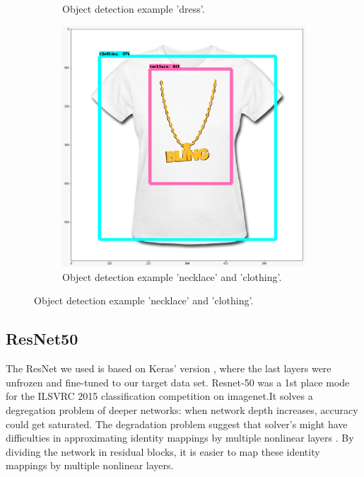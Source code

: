 \documentclass[10pt, a4paper]{article}
\begin{document}
\begin{multicols}{2}
\begin{figure}[H]
\begin{subfigure}[b]{0.3\columnwidth}
            \caption{Object detection example 'dress'.}
            \label{fig:object_dress}
          \end{subfigure}
          \hfill %
          \begin{subfigure}[b]{0.4\columnwidth}
            \includegraphics[width=\linewidth]{img/t_shirt_object_detection.jpeg}
            \caption{Object detection example 'necklace' and 'clothing'.}
            \label{fig:object_necklace_clothing}
          \end{subfigure}
        \end{figure}
		
		
		\subsection{ResNet50}
		The ResNet we used is based on Keras' version \cite{DBLP:journals/corr/HeZRS15}, where the last layers were unfrozen and fine-tuned to our target data set. Resnet-50 was a 
		1st place mode for the ILSVRC 2015 classification competition on imagenet.It solves a degregation problem of deeper networks: when network depth increases, accuracy could get saturated. The degradation problem suggest that solver's might have difficulties in approximating identity mappings by multiple nonlinear layers \cite{he2016deep}.
		By dividing the network in residual blocks, it is easier to map these identity mappings by multiple nonlinear layers.
		

\end{multicols}
\end{document}
